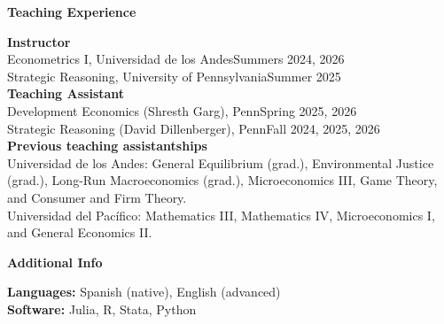 \documentclass[11pt,letterpaper]{article}
\newcommand{\cvsection}[2]{%
  \par\vspace{9pt}%
  \noindent
  \begin{minipage}[t]{1.25in}
    \vspace{0pt}\raggedright\small\bfseries\color{pennblue}#1
  \end{minipage}%
  \hspace{0.13in}%
  \begin{minipage}[t]{\dimexpr\textwidth-1.38in\relax}
    \vspace{0pt}#2
  \end{minipage}%
  \par
}
\begin{document}
\cvsection{Teaching Experience}{
  \textbf{Instructor}\\
  Econometrics I, Universidad de los Andes\hfill Summers 2024, 2026\\
  Strategic Reasoning, University of Pennsylvania\hfill Summer 2025\\[3pt]
  \textbf{Teaching Assistant}\\
  Development Economics (Shresth Garg), Penn\hfill Spring 2025, 2026\\
  Strategic Reasoning (David Dillenberger), Penn\hfill Fall 2024, 2025, 2026\\[3pt]
  \textbf{Previous teaching assistantships}\\
  Universidad de los Andes: General Equilibrium (grad.),
  Environmental Justice (grad.), Long-Run Macroeconomics (grad.),
  Microeconomics III, Game Theory, and Consumer and Firm Theory.\\
  Universidad del Pacífico: Mathematics III,
  Mathematics IV, Microeconomics I, and General Economics II.
}

\cvsection{Additional Info}{
  \textbf{Languages:} Spanish (native), English (advanced)\\
  \textbf{Software:} Julia, R, Stata, Python
}
\end{document}
